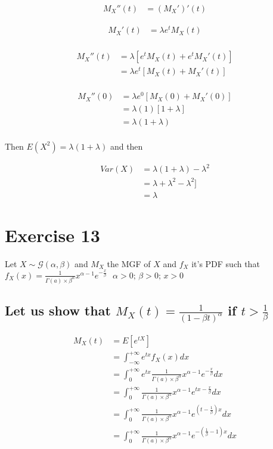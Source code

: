 \documentclass[11pt]{article}
\def\gt{>}
\begin{document}
\begin{align*}
M_X''(t)&=(M_X')'(t)
\end{align*}

\begin{align*}
M_X'(t)&=\lambda e^{t}M_X(t)\\
\end{align*}

\begin{align*}
M_X''(t)&=\lambda[ e^{t}M_X(t)+e^{t}M_X'(t)]\\
&=\lambda e^{t}[ M_X(t)+M_X'(t)]\\
\end{align*}


\begin{align*}
M_X''(0)&=\lambda e^{0}[ M_X(0)+M_X'(0)]\\
        &=\lambda (1)[ 1+\lambda]\\
        &=\lambda (1+\lambda)\\
\end{align*}

Then $E(X^2)=\lambda (1+\lambda)$ and then 

\begin{align*}
Var(X)&=\lambda (1+\lambda)- \lambda ^2\\
        &=\lambda +\lambda ^2 -\lambda ^2]\\
        &=\lambda 
\end{align*}
\newpage 
\section{Exercise 13}
 Let $X  \sim \mathcal G(\alpha,\beta)$ and $M_X$ the MGF of $X$ and $f_X$ it's PDF such that
 $f_X(x)=\frac{1}{\Gamma(a)\times \beta ^\alpha} x^{\alpha-1}e^{-\frac{x}{\beta}}\text{ } \alpha \gt 0 \text{; } \beta \gt 0 \text{; }x\gt 0$
 
 \subsection{Let us show that $M_X(t)=\frac{1}{(1-\beta t)^\alpha}$ if $t\gt \frac{1}{\beta}$}
 
 
\begin{align*}
M_X(t)&=E[e^{tX}]\\
&=\int_{-\infty}^{+\infty} e^{tx}f_X(x)dx\\
&=\int_{0}^{+\infty} e^{tx}\frac{1}{\Gamma(a)\times \beta ^\alpha} x^{\alpha-1}e^{-\frac{x}{\beta}}dx\\
&=\int_{0}^{+\infty}\frac{1}{\Gamma(a)\times \beta ^\alpha} x^{\alpha-1}e^{tx-\frac{x}{\beta}}dx\\
&=\int_{0}^{+\infty}\frac{1}{\Gamma(a)\times \beta ^\alpha} x^{\alpha-1}e^{(t-\frac{1}{\beta})x}dx\\
&=\int_{0}^{+\infty}\frac{1}{\Gamma(a)\times \beta ^\alpha} x^{\alpha-1}e^{-(\frac{1}{\beta}-1)x}dx\\
\end{align*}
\end{document}
